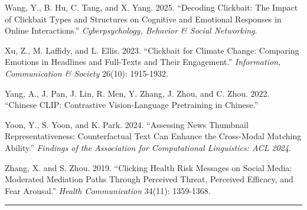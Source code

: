 \documentclass[
  fontset=none]{ctexart}
\begin{document}
Wang, Y., B. Hu, C. Tang, and X. Yang. 2025. ``Decoding Clickbait: The Impact of Clickbait Types and Structures on Cognitive and Emotional Responses in Online Interactions.'' \emph{Cyberpsychology, Behavior \& Social Networking}.

Xu, Z., M. Laffidy, and L. Ellis. 2023. ``Clickbait for Climate Change: Comparing Emotions in Headlines and Full-Texts and Their Engagement.'' \emph{Information, Communication \& Society} 26(10): 1915-1932.

Yang, A., J. Pan, J. Lin, R. Men, Y. Zhang, J. Zhou, and C. Zhou. 2022. ``Chinese CLIP: Contrastive Vision-Language Pretraining in Chinese.''

Yoon, Y., S. Yoon, and K. Park. 2024. ``Assessing News Thumbnail Representativeness: Counterfactual Text Can Enhance the Cross-Modal Matching Ability.'' \emph{Findings of the Association for Computational Linguistics: ACL 2024}.

Zhang, X. and S. Zhou. 2019. ``Clicking Health Risk Messages on Social Media: Moderated Mediation Paths Through Perceived Threat, Perceived Efficacy, and Fear Arousal.'' \emph{Health Communication} 34(11): 1359-1368.

\begin{center}\rule{0.5\linewidth}{0.5pt}\end{center}
\end{document}
